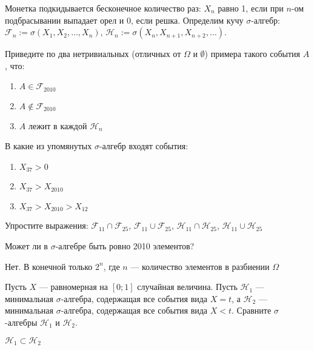 \begin{problem}
Монетка подкидывается бесконечное количество раз: $X_{n}$ равно 1, если при $ n $-ом подбрасывании выпадает орел и 0, если решка. 
Определим кучу $ \sigma $-алгебр: $\mathcal{F}_{n}:=\sigma(X_{1},X_{2},\ldots,X_{n})$, $\mathcal{H}_{n}:=\sigma(X_{n},X_{n+1},X_{n+2},\ldots)$.

Приведите по два нетривиальных (отличных от $\Omega$ и $\emptyset$) примера такого события $A$, что:

\begin{enumerate}
\item $ A\in \mathcal{F}_{2010} $
\item $ A\notin \mathcal{F}_{2010} $
\item $A$ лежит в каждой $\mathcal{H}_{n}$
\end{enumerate}

В какие из упомянутых $ \sigma $-алгебр входят события:
\begin{enumerate}
\item $ X_{37}>0$
\item $ X_{37}>X_{2010}$
\item $ X_{37}>X_{2010}>X_{12}$
\end{enumerate}

Упростите выражения: $ \mathcal{F}_{11}\cap \mathcal{F}_{25} $, $ \mathcal{F}_{11}\cup \mathcal{F}_{25} $, $ \mathcal{H}_{11}\cap \mathcal{H}_{25} $, $ \mathcal{H}_{11}\cup \mathcal{H}_{25} $

\begin{sol}

\end{sol}
\end{problem}

\begin{problem}
Может ли в $ \sigma $-алгебре быть ровно 2010 элементов?

\begin{sol}
Нет. В конечной только $2^n$, где $n$ — количество элементов в разбиении $\Omega$
\end{sol}
\end{problem}

\begin{problem}
Пусть $X$ — равномерная на $ [0;1] $ случайная величина. Пусть $ \mathcal{H}_{1} $ — минимальная $ \sigma $-алгебра, содержащая все события вида $ X=t $, а $ \mathcal{H}_{2} $ — минимальная $ \sigma $-алгебра, содержащая все события вида $X<t$. Сравните $\sigma$-алгебры $ \mathcal{H}_{1} $ и $ \mathcal{H}_{2} $.

\begin{sol}
$ \mathcal{H}_{1} \subset \mathcal{H}_{2} $
\end{sol}
\end{problem}

